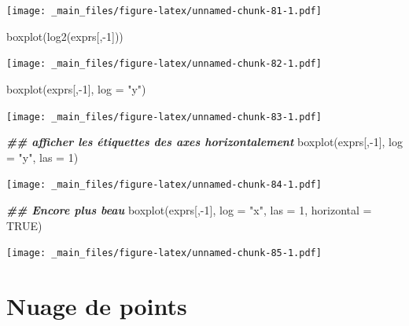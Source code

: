 \documentclass[
]{book}
\newenvironment{Shaded}{\begin{snugshade}}{\end{snugshade}}
\newcommand{\AttributeTok}[1]{\textcolor[rgb]{0.77,0.63,0.00}{#1}}
\newcommand{\ConstantTok}[1]{\textcolor[rgb]{0.00,0.00,0.00}{#1}}
\newcommand{\DecValTok}[1]{\textcolor[rgb]{0.00,0.00,0.81}{#1}}
\newcommand{\DocumentationTok}[1]{\textcolor[rgb]{0.56,0.35,0.01}{\textbf{\textit{#1}}}}
\newcommand{\FunctionTok}[1]{\textcolor[rgb]{0.00,0.00,0.00}{#1}}
\newcommand{\NormalTok}[1]{#1}
\newcommand{\SpecialCharTok}[1]{\textcolor[rgb]{0.00,0.00,0.00}{#1}}
\newcommand{\StringTok}[1]{\textcolor[rgb]{0.31,0.60,0.02}{#1}}
\begin{document}
\texttt{[image: \_main\_files/figure-latex/unnamed-chunk-81-1.pdf]}

\begin{Shaded}
\begin{Highlighting}[]
\FunctionTok{boxplot}\NormalTok{(}\FunctionTok{log2}\NormalTok{(exprs[,}\SpecialCharTok{{-}}\DecValTok{1}\NormalTok{]))}
\end{Highlighting}
\end{Shaded}

\texttt{[image: \_main\_files/figure-latex/unnamed-chunk-82-1.pdf]}

\begin{Shaded}
\begin{Highlighting}[]
\FunctionTok{boxplot}\NormalTok{(exprs[,}\SpecialCharTok{{-}}\DecValTok{1}\NormalTok{], }\AttributeTok{log =} \StringTok{"y"}\NormalTok{)}
\end{Highlighting}
\end{Shaded}

\texttt{[image: \_main\_files/figure-latex/unnamed-chunk-83-1.pdf]}

\begin{Shaded}
\begin{Highlighting}[]
\DocumentationTok{\#\# afficher les étiquettes des axes horizontalement}
\FunctionTok{boxplot}\NormalTok{(exprs[,}\SpecialCharTok{{-}}\DecValTok{1}\NormalTok{], }\AttributeTok{log =} \StringTok{"y"}\NormalTok{, }\AttributeTok{las =} \DecValTok{1}\NormalTok{) }
\end{Highlighting}
\end{Shaded}

\texttt{[image: \_main\_files/figure-latex/unnamed-chunk-84-1.pdf]}

\begin{Shaded}
\begin{Highlighting}[]
\DocumentationTok{\#\# Encore plus beau}
\FunctionTok{boxplot}\NormalTok{(exprs[,}\SpecialCharTok{{-}}\DecValTok{1}\NormalTok{], }\AttributeTok{log =} \StringTok{"x"}\NormalTok{, }\AttributeTok{las =} \DecValTok{1}\NormalTok{, }\AttributeTok{horizontal =} \ConstantTok{TRUE}\NormalTok{) }
\end{Highlighting}
\end{Shaded}

\texttt{[image: \_main\_files/figure-latex/unnamed-chunk-85-1.pdf]}

\hypertarget{nuage-de-points}{%
\section{Nuage de points}\label{nuage-de-points}}
\end{document}
